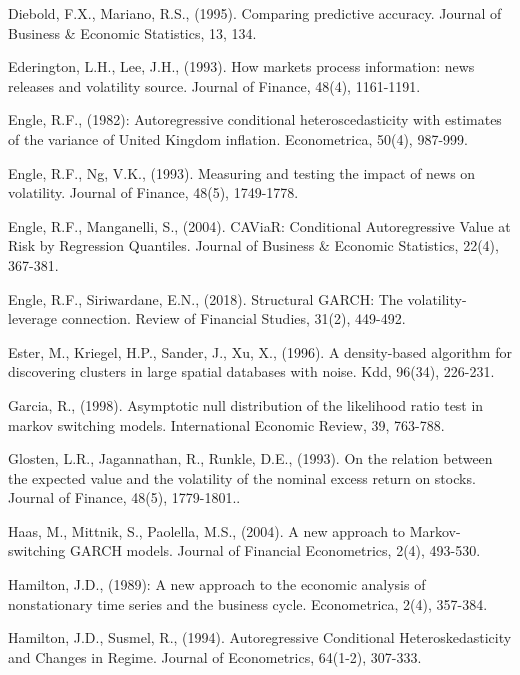\documentclass[preprint,12pt,authoryear]{elsarticle}
\begin{document}
\begin{thebibliography}{00}
Diebold, F.X., Mariano, R.S., (1995). Comparing predictive accuracy. Journal of Business
\& Economic Statistics, 13, 134.

Ederington, L.H., Lee, J.H., (1993). How markets process information: news releases and volatility source. Journal of Finance, 48(4), 1161-1191.

 Engle, R.F., (1982): Autoregressive conditional heteroscedasticity
with estimates of the variance of United Kingdom inflation.
Econometrica, 50(4), 987-999.

 Engle, R.F., Ng, V.K., (1993). Measuring and testing the impact of news on volatility. Journal of Finance, 48(5), 1749-1778.

 Engle, R.F., Manganelli, S., (2004). CAViaR: Conditional Autoregressive Value at Risk by Regression Quantiles. Journal of Business \& Economic Statistics, 22(4), 367-381.

 Engle, R.F., Siriwardane, E.N., (2018). Structural GARCH: The volatility-leverage connection. Review of Financial Studies, 31(2), 449-492.

 Ester, M., Kriegel, H.P., Sander, J., Xu, X., (1996). A density-based algorithm for discovering clusters in large spatial databases with noise. Kdd, 96(34), 226-231.

 Garcia, R., (1998). Asymptotic null distribution of the likelihood ratio test in markov switching models. International Economic Review, 39, 763-788.

 Glosten, L.R., Jagannathan, R., Runkle, D.E., (1993). On the relation between the expected value and the volatility of the nominal excess return on stocks. Journal of Finance, 48(5), 1779-1801..

 Haas, M., Mittnik, S., Paolella, M.S., (2004). A new approach to Markov-switching GARCH models. Journal of Financial Econometrics, 2(4), 493-530.

 Hamilton, J.D., (1989): A new approach to the economic analysis of nonstationary time series and the business cycle. Econometrica, 2(4), 357-384.

 Hamilton, J.D., Susmel, R., (1994). Autoregressive Conditional Heteroskedasticity and Changes in Regime. Journal of Econometrics, 64(1-2), 307-333.


\end{thebibliography}
\end{document}
